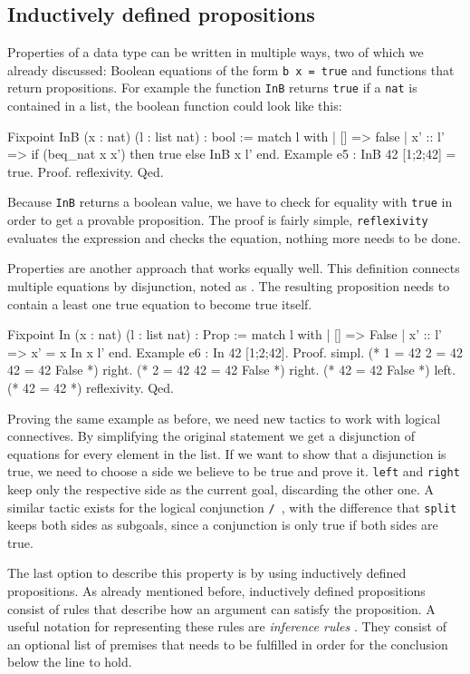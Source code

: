 \documentclass[fleqn, abstract=on]{scrreprt}
\newcommand{\coqinline}[1]{\texttt{#1}}
\begin{document}
\subsection{Inductively defined propositions}
Properties of a data type can be written in multiple ways, two of which we already discussed: Boolean equations of the form \coqinline{b x = true} and functions that return propositions. For example the function \coqinline{InB} returns \coqinline{true} if a \coqinline{nat} is contained in a list, the boolean function could look like this:
\begin{coqcode}
Fixpoint InB (x : nat) (l : list nat) : bool :=
match l with
| [] => false
| x' :: l' => if (beq_nat x x') then true else InB x l'
end.
Example e5 : InB 42 [1;2;42] = true.
Proof. reflexivity. Qed.
\end{coqcode}
Because \coqinline{InB} returns a boolean value, we have to check for equality with \coqinline{true} in order to get a provable proposition. The proof is fairly simple, \coqinline{reflexivity} evaluates the expression and checks the equation, nothing more needs to be done.
\par 
Properties are another approach that works equally well. This definition connects multiple equations by disjunction, noted as \coqinline{\/}. The resulting proposition needs to contain a least one true equation to become true itself.
\begin{coqcode}
Fixpoint In (x : nat) (l : list nat) : Prop :=
match l with
| [] => False
| x' :: l' => x' = x \/ In x l'
end.
Example e6 : In 42 [1;2;42].
Proof. 
  simpl. (* 1 = 42 \/ 2 = 42 \/ 42 = 42 \/ False *)
  right.           (* 2 = 42 \/ 42 = 42 \/ False *)
  right.                     (* 42 = 42 \/ False *)
  left.                      (* 42 = 42 *)
  reflexivity.
Qed.
\end{coqcode}
Proving the same example as before, we need new tactics to work with logical connectives. By simplifying the original statement we get a disjunction of equations for every element in the list. If we want to show that a disjunction is true, we need to choose a side we believe to be true and prove it. \coqinline{left} and \coqinline{right} keep only the respective side as the current goal, discarding the other one. A similar tactic exists for the logical conjunction \coqinline{/\ }, with the difference that \coqinline{split} keeps both sides as subgoals, since a conjunction is only true if both sides are true.
\par
The last option to describe this property is by using inductively defined propositions. As already mentioned before, inductively defined propositions consist of rules that describe how an argument can satisfy the proposition. A useful notation for representing these rules are \textit{inference rules} \label{infrules}. They consist of an optional list of premises that needs to be fulfilled in order for the conclusion below the line to hold.
\end{document}
